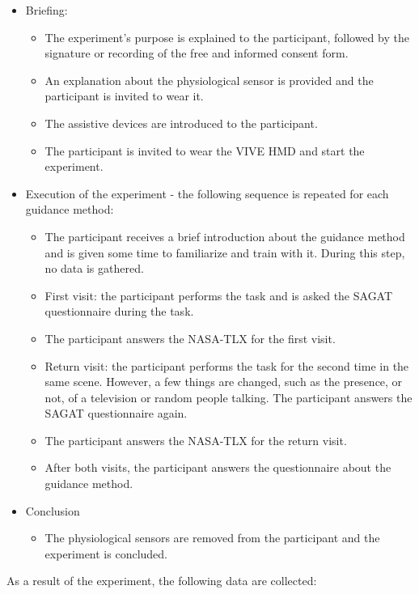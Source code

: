 \begin{itemize}
    \item Briefing:
    \begin{itemize}
        \item The experiment's purpose is explained to the participant, followed by the signature or recording of the free and informed consent form.
        \item An explanation about the physiological sensor is provided and the participant is invited to wear it.
        \item The assistive devices are introduced to the participant.
        \item The participant is invited to wear the VIVE HMD and start the experiment. 
    \end{itemize}
    \item Execution of the experiment - the following sequence is repeated for each guidance method:
    \begin{itemize}
        \item The participant receives a brief introduction about the guidance method and is given some time to familiarize and train with it. During this step, no data is gathered. 
        \item First visit: the participant performs the task and is asked the SAGAT questionnaire during the task.
        \item The participant answers the NASA-TLX for the first visit.
        \item Return visit: the participant performs the task for the second time in the same scene. However, a few things are changed, such as the presence, or not, of a television or random people talking. The participant answers the SAGAT questionnaire again.
        \item The participant answers the NASA-TLX for the return visit.
        \item After both visits, the participant answers the questionnaire about the guidance method.
    \end{itemize}
    \item Conclusion
    \begin{itemize}
        \item The physiological sensors are removed from the participant and the experiment is concluded.
    \end{itemize}
\end{itemize}

As a result of the experiment, the following data are collected:

